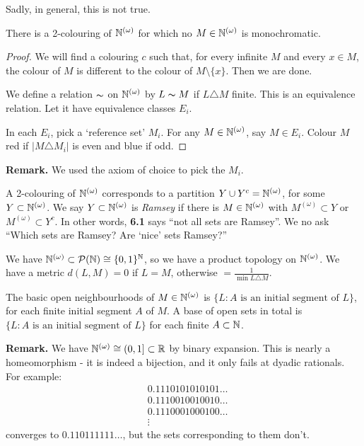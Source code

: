 \documentclass[10pt,a4paper]{article}
\begin{document}
Sadly, in general, this is not true.
\begin{proposition}
  There is a 2-colouring of $\mathbb{N}^{(\omega)}$ for which no $M \in \mathbb{N}^{(\omega)}$ is monochromatic.
\end{proposition}
\begin{proof}
  We will find a colouring $c$ such that, for every infinite $M$ and every $x \in M$, the colour of $M$ is different to the colour of $M \setminus \{x\}$. Then we are done.

  We define a relation $\thicksim$ on $\mathbb{N}^{(\omega)}$ by $L \thicksim M$ if $L \triangle M$ finite. This is an equivalence relation. Let it have equivalence classes $E_i$.

  In each $E_i$, pick a `reference set' $M_i$. For any $M \in \mathbb{N}^{(\omega)}$, say $M \in E_i$. Colour $M$ red if $|M \triangle M_i|$ is even and blue if odd.
\end{proof}
\textbf{Remark.} We used the axiom of choice to pick the $M_i$.

A 2-colouring of $\mathbb{N}^{(\omega)}$ corresponds to a partition $Y \cup Y^c = \mathbb{N}^{(\omega)}$, for some $Y \subset \mathbb{N}^{(\omega)}$. We say $Y \subset \mathbb{N}^{(\omega)}$ is \emph{Ramsey} if there is $M \in \mathbb{N}^{(\omega)}$ with $M^{(\omega)} \subset Y$ or $M^{(\omega)} \subset Y^c$. In other words, \textbf{6.1} says ``not all sets are Ramsey''. We no ask ``Which sets are Ramsey? Are `nice' sets Ramsey?''

We have $\mathbb{N}^{(\omega)} \subset \mathcal{P}(\mathbb{N}) \cong \{0,1\}^{\mathbb{N}}$, so we have a product topology on $\mathbb{N}^{(\omega)}$. We have a metric $d(L,M) = 0$ if $L = M$, otherwise $ = \frac{1}{\min L \triangle M}$.

The basic open neighbourhoods of $M \in \mathbb{N}^{(\omega)}$ is $\{L: A \text{ is an initial segment of }L \}$, for each finite initial segment $A$ of $M$. A base of open sets in total is $\{L: A\text{ is an initial segment of }L\}$ for each finite $A \subset \mathbb{N}$.

\textbf{Remark.} We have $\mathbb{N}^{(\omega)} \cong (0,1] \subset \mathbb{R}$ by binary expansion. This is nearly a homeomorphism - it is indeed a bijection, and it only fails at dyadic rationals. For example:
\begin{align*}
  &0.1110101010101\ldots\\
  &0.1110010010010\ldots\\
  &0.1110001000100\ldots\\
  &\vdots
\end{align*}
converges to $0.110111111\ldots$, but the sets corresponding to them don't.
\end{document}
